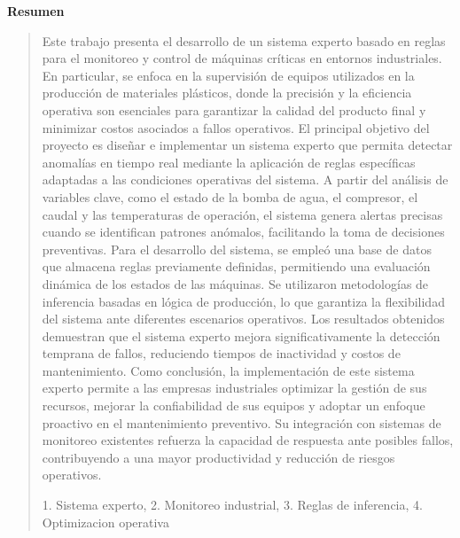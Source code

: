 \thispagestyle{empty}
\begin{center}
\begin{LARGE}
\textbf{Resumen}
\end{LARGE}
\end{center}
\begin{quotation}
Este trabajo presenta el desarrollo de un sistema experto basado en reglas para el monitoreo y control de máquinas críticas en entornos industriales. En particular, se enfoca en la supervisión de equipos utilizados en la producción de materiales plásticos, donde la precisión y la eficiencia operativa son esenciales para garantizar la calidad del producto final y minimizar costos asociados a fallos operativos.
El principal objetivo del proyecto es diseñar e implementar un sistema experto que permita detectar anomalías en tiempo real mediante la aplicación de reglas específicas adaptadas a las condiciones operativas del sistema. A partir del análisis de variables clave, como el estado de la bomba de agua, el compresor, el caudal y las temperaturas de operación, el sistema genera alertas precisas cuando se identifican patrones anómalos, facilitando la toma de decisiones preventivas.
Para el desarrollo del sistema, se empleó una base de datos que almacena reglas previamente definidas, permitiendo una evaluación dinámica de los estados de las máquinas. Se utilizaron metodologías de inferencia basadas en lógica de producción, lo que garantiza la flexibilidad del sistema ante diferentes escenarios operativos. Los resultados obtenidos demuestran que el sistema experto mejora significativamente la detección temprana de fallos, reduciendo tiempos de inactividad y costos de mantenimiento.
Como conclusión, la implementación de este sistema experto permite a las empresas industriales optimizar la gestión de sus recursos, mejorar la confiabilidad de sus equipos y adoptar un enfoque proactivo en el mantenimiento preventivo. Su integración con sistemas de monitoreo existentes refuerza la capacidad de respuesta ante posibles fallos, contribuyendo a una mayor productividad y reducción de riesgos operativos.
    
\vspace*{0.5cm}

 1. Sistema experto, 2. Monitoreo industrial, 3. Reglas de inferencia, 4. Optimizacion operativa

\end{quotation}

